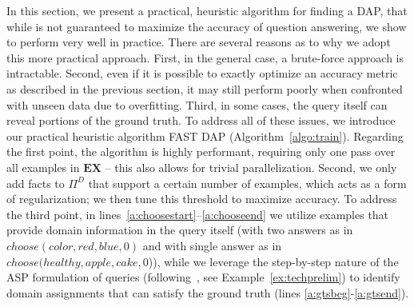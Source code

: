 In this section, we present a practical, heuristic algorithm for finding a DAP, that while is not guaranteed to maximize the accuracy of question answering, we show to perform very well in practice.  There are several reasons as to why we adopt this more practical approach.  First, in the general case, a brute-force approach is intractable.  Second, even if it is possible to exactly optimize an accuracy metric as described in the previous section, it may still perform poorly when confronted with unseen data due to overfitting.  Third, in some cases, the query itself can reveal portions of the ground truth.  To address all of these issues, we introduce our practical heuristic algorithm FAST DAP (Algorithm~\ref{algo:train}).
Regarding the first point, the algorithm is highly performant, requiring only one pass over all examples in $\textbf{EX}$ -- this also allows for trivial parallelization.  Second, we only add facts to $\Pi^D$ that support a certain number of examples, which acts as a form of regularization; we then tune this threshold to maximize accuracy.  
To address the third point, in lines~\ref{a:choosestart}--\ref{a:chooseend} we utilize examples that provide domain information in the query itself (with two answers as in $choose(color, red, blue, 0)$ and with single answer as in $choose(healthy, apple, cake, 0$)), while we leverage the step-by-step nature of the ASP formulation of queries (following~\cite{eiter2022neuro}, see Example~\ref{ex:techprelim}) to identify domain assignments that can satisfy the ground truth (lines \ref{a:gtsbeg}-\ref{a:gtsend}).




